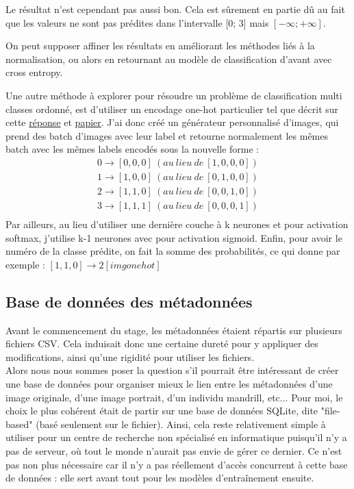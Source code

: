 Le résultat n'est cependant pas aussi bon. Cela est sûrement en partie dû au fait que les valeurs ne sont pas prédites dans l'intervalle [0; 3] mais $[-\infty; +\infty]$.

On peut supposer affiner les résultats en améliorant les méthodes liés à la normalisation, ou alors en retournant au modèle de \gls{classification} d'avant avec cross entropy.

Une autre méthode à explorer pour résoudre un problème de \gls{classification} multi classes ordonné, est d'utiliser un encodage one-hot particulier tel que décrit sur cette \href{https://stats.stackexchange.com/questions/140061/how-to-set-up-neural-network-to-output-ordinal-data}{réponse} et  \href{https://arxiv.org/pdf/1901.07884.pdf}{papier}.
J'ai donc créé un générateur personnalisé d'images, qui prend des \gls{batch} d'images avec leur label et retourne normalement les mêmes \gls{batch} avec les mêmes labels encodés sous la nouvelle forme :\\
\begin{gather*}
0 \longrightarrow [0, 0, 0]\ (au\ lieu\ de\ [1, 0, 0, 0])\\
1 \longrightarrow [1, 0, 0]\ (au\ lieu\ de\ [0, 1, 0, 0])\\
2 \longrightarrow [1, 1, 0]\ (au\ lieu\ de\ [0, 0, 1, 0])\\
3 \longrightarrow [1, 1, 1]\ (au\ lieu\ de\ [0, 0, 0, 1])\\
\end{gather*}
Par ailleurs, au lieu d'utiliser une dernière couche à k neurones et pour activation softmax, j'utilise k-1 neurones avec pour activation sigmoid. Enfin, pour avoir le numéro de la classe prédite, on fait la somme des probabilités, ce qui donne par exemple : $[1,1,0] \longrightarrow 2
[img onehot]$

\subsection{Base de données des métadonnées}
Avant le commencement du stage, les métadonnées étaient répartis sur plusieurs fichiers \gls{CSV}. Cela induisait donc une certaine dureté pour y appliquer des modifications, ainsi qu'une rigidité pour utiliser les fichiers.\\

Alors nous nous sommes poser la question s'il pourrait être intéressant de créer une base de données pour organiser mieux le lien entre les métadonnées d'une image originale, d'une image portrait, d'un individu mandrill, etc...
Pour moi, le choix le plus cohérent était de partir sur une base de données \gls{SQLite}, dite "file-based" (basé seulement sur le fichier). Ainsi, cela reste relativement simple à utiliser pour un centre de recherche non spécialisé en informatique puisqu'il n'y a pas de serveur, où tout le monde n'aurait pas envie de gérer ce dernier. Ce n'est pas non plus nécessaire car il n'y a pas réellement d'accès concurrent à cette base de données : elle sert avant tout pour les modèles d'entraînement ensuite.

